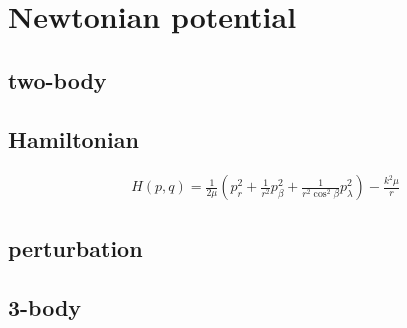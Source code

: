 \documentclass[main.tex]{subfiles}
\begin{document}
\chapter{Newtonian potential}
\PartialToc

\section{two-body}

\section{Hamiltonian}

\begin{align*}
&H(p,q)=\frac{1}{2\mu}(p_r^2+\frac{1}{r^2}p_{\beta}^2+\frac{1}{r^2\cos^2{\beta}}p_{\lambda}^2)-\frac{k^2\mu}{r}
\end{align*}


\section{perturbation}

\section{3-body}
\end{document}
